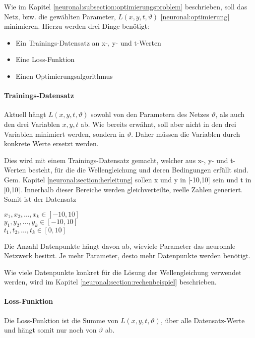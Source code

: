 Wie im Kapitel \ref{neuronal:subsection:optimierungsproblem} beschrieben, soll das Netz, bzw. die gewählten Parameter, \( L(x, y, t, \vartheta) \) \eqref{neuronal:optimierung} minimieren.
Hierzu werden drei Dinge benötigt:
\begin{itemize}
    \item Ein Trainings-Datensatz an x-, y- und t-Werten
    \item Eine Loss-Funktion
    \item Einen Optimierungsalgorithmus
\end{itemize}

\paragraph{Trainings-Datensatz}

Aktuell hängt \( L(x, y, t, \vartheta) \) sowohl von den Parametern des Netzes \( \vartheta \), als auch den drei Variablen \( x, y, t \) ab.
Wie bereits erwähnt, soll aber nicht in den drei Variablen minimiert werden, sondern in \( \vartheta \).
Daher müssen die Variablen durch konkrete Werte ersetzt werden.

Dies wird mit einem Trainings-Datensatz gemacht, welcher aus x-, y- und t-Werten besteht, für die die Wellengleichung und deren Bedingungen erfüllt sind.
Gem. Kapitel \ref{neuronal:section:herleitung} sollen x und y in [-10,10] sein und t in [0,10].
Innerhalb dieser Bereiche werden gleichverteilte, reelle Zahlen generiert.
Somit ist der Datensatz
\begin{center}
    \( x_1, x_2, \ldots, x_k \in [-10,10] \)\\
    \( y_1, y_2, \ldots, y_k \in [-10,10] \)\\
    \( t_1, t_2, \ldots, t_k \in [0,10] \)\\
\end{center}

Die Anzahl Datenpunkte hängt davon ab, wieviele Parameter das neuronale Netzwerk besitzt.
Je mehr Parameter, desto mehr Datenpunkte werden benötigt.

Wie viele Datenpunkte konkret für die Lösung der Wellengleichung verwendet werden, wird im Kapitel \ref{neuronal:section:rechenbeispiel} beschrieben.

\paragraph{Loss-Funktion}

Die Loss-Funktion ist die Summe von \( L(x, y, t, \vartheta) \), über alle Datensatz-Werte und hängt somit nur noch von \( \vartheta \) ab. 

